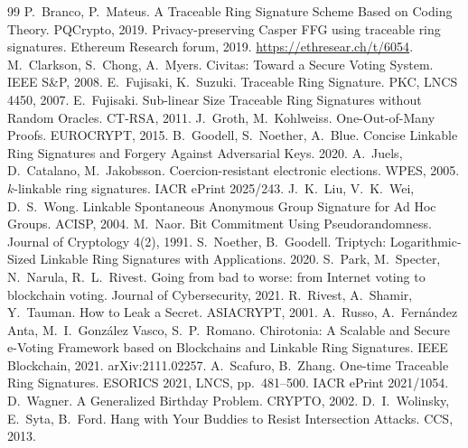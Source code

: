\documentclass[11pt,a4paper]{article}
\theoremstyle{definition}
\begin{document}
\begin{thebibliography}{99}\small
{} P.~Branco, P.~Mateus. A Traceable Ring Signature Scheme Based on Coding Theory. PQCrypto, 2019.
 Privacy-preserving Casper FFG using traceable ring signatures. Ethereum Research forum, 2019. \url{https://ethresear.ch/t/6054}.
 M.~Clarkson, S.~Chong, A.~Myers. Civitas: Toward a Secure Voting System. IEEE S\&P, 2008.
 E.~Fujisaki, K.~Suzuki. Traceable Ring Signature. PKC, LNCS 4450, 2007.
 E.~Fujisaki. Sub-linear Size Traceable Ring Signatures without Random Oracles. CT-RSA, 2011.
 J.~Groth, M.~Kohlweiss. One-Out-of-Many Proofs. EUROCRYPT, 2015.
 B.~Goodell, S.~Noether, A.~Blue. Concise Linkable Ring Signatures and Forgery Against Adversarial Keys. 2020.
 A.~Juels, D.~Catalano, M.~Jakobsson. Coercion-resistant electronic elections. WPES, 2005.
 $k$-linkable ring signatures. IACR ePrint 2025/243.
 J.~K.~Liu, V.~K.~Wei, D.~S.~Wong. Linkable Spontaneous Anonymous Group Signature for Ad Hoc Groups. ACISP, 2004.
 M.~Naor. Bit Commitment Using Pseudorandomness. Journal of Cryptology 4(2), 1991.
 S.~Noether, B.~Goodell. Triptych: Logarithmic-Sized Linkable Ring Signatures with Applications. 2020.
 S.~Park, M.~Specter, N.~Narula, R.~L.~Rivest. Going from bad to worse: from Internet voting to blockchain voting. Journal of Cybersecurity, 2021.
 R.~Rivest, A.~Shamir, Y.~Tauman. How to Leak a Secret. ASIACRYPT, 2001.
 A.~Russo, A.~Fern\'andez Anta, M.~I.~Gonz\'alez Vasco, S.~P.~Romano. Chirotonia: A Scalable and Secure e-Voting Framework based on Blockchains and Linkable Ring Signatures. IEEE Blockchain, 2021. arXiv:2111.02257.
 A.~Scafuro, B.~Zhang. One-time Traceable Ring Signatures. ESORICS 2021, LNCS, pp.~481--500. IACR ePrint 2021/1054.
 D.~Wagner. A Generalized Birthday Problem. CRYPTO, 2002.
 D.~I.~Wolinsky, E.~Syta, B.~Ford. Hang with Your Buddies to Resist Intersection Attacks. CCS, 2013.
\end{thebibliography}
\end{document}
